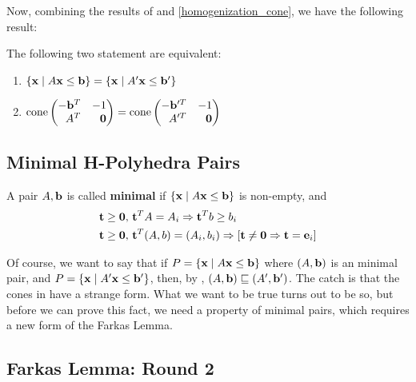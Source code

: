 Now, combining the results of  and \cref{homogenization_cone}, we have the following result:

\begin{Prop}\label{dual_homogenization_cone}
	The following two statement are equivalent:
	\begin{enumerate}
		\item $\left\{\mathbf{x}\;|\; A\mathbf{x}\leq \mathbf{b}\right\} = \left\{\mathbf{x}\;|\; A'\mathbf{x}\leq \mathbf{b}'\right\}$
		\item $\cone \pmb -\b^T & -1 \\ A^T & \0 \pme = \cone \pmb -\b'^T & -1 \\ A'^T & \0 \pme$
	\end{enumerate}
\end{Prop}

\subsection{Minimal H-Polyhedra Pairs}
\begin{Def}{\label{min_hpair}
		A pair $A,\mathbf{b}$ is called \textbf{minimal} if $\left\{\mathbf{x}\;|\; A\mathbf{x}\leq \mathbf{b}\right\}$ is non-empty, and
		\begin{align*}
			 & \mathbf{t} \geq \mathbf{0},\, \mathbf{t}^T A = A_i \Rightarrow \mathbf{t}^T b \geq b_i                             \\
			 & \mathbf{t} \geq \mathbf{0},\, \mathbf{t}^T(A,b) = (A_i,b_i) \Rightarrow [\mathbf{t} \neq \mathbf{0} \Rightarrow \mathbf{t} = \mathbf{e}_i] \\
		\end{align*}
	}\end{Def}

Of course, we want to say that if $P = \left\{\mathbf{x}\;|\; A\mathbf{x}\leq \mathbf{b}\right\}$ where $(A,\mathbf{b})$ is an minimal pair, and $P = \left\{\mathbf{x}\;|\; A'\mathbf{x}\leq \mathbf{b}'\right\}$, then, by , $(A,\mathbf{b}) \sqsubseteq (A',\mathbf{b}')$.  The catch is that the cones in  have a strange form.  What we want to be true turns out to be so, but before we can prove this fact, we need a property of minimal pairs, which requires a new form of the Farkas Lemma.

\subsection{Farkas Lemma: Round 2}

